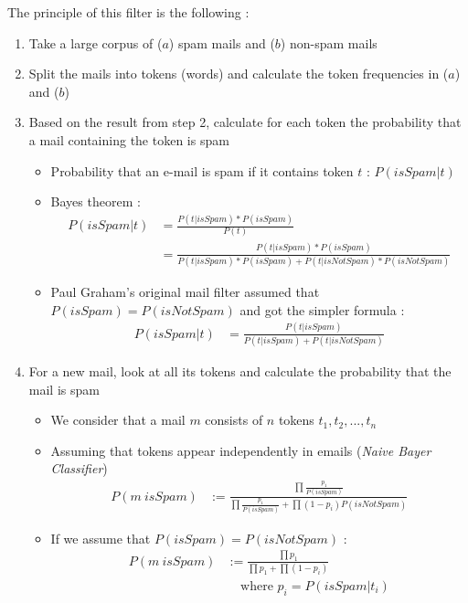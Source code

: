 The principle of this filter is the following :
\begin{enumerate}
    \item Take a large corpus of ($a$) spam mails and ($b$) non-spam mails
    \item Split the mails into tokens (words) and calculate the token frequencies in ($a$) and ($b$)
    \item Based on the result from step 2, calculate for each token the probability that a mail containing the token is spam
    \begin{itemize}
        \item Probability that an e-mail is spam if it contains token $t$ : $P(isSpam | t)$
        \item Bayes theorem :
        \begin{align*}
        P(isSpam | t) &= \frac{P(t | isSpam) * P(isSpam)}{P(t)}\\
                      &= \frac{P(t | isSpam) * P(isSpam)}{P(t | isSpam) * P(isSpam) + P(t | isNotSpam) * P(isNotSpam)}
        \end{align*}
        \item Paul Graham's original mail filter assumed that $P(isSpam) = P(isNotSpam)$ and got the simpler formula :
        \begin{align*}
        P(isSpam | t) &= \frac{P(t | isSpam)}{P(t | isSpam) + P(t | isNotSpam)}
        \end{align*}
    \end{itemize}
    \item For a new mail, look at all its tokens and calculate the probability that the mail is spam
    \begin{itemize}
        \item We consider that a mail $m$ consists of $n$ tokens $t_1, t_2, ..., t_n$
        \item Assuming that tokens appear independently in emails (\textit{Naive Bayer Classifier})
        \begin{align*}
        P(m\ isSpam) &:= \frac{\prod \frac{p_1}{P(isSpam)}}{\prod \frac{p_1}{P(isSpam)} + \prod(1-p_i)P(isNotSpam)}
        \end{align*}
        \item If we assume that $P(isSpam) = P(isNotSpam)$ :
        \begin{align*}
        P(m\ isSpam) &:= \frac{\prod p_1}{\prod p_1 + \prod(1-p_i)}\\
                     &\ \ \ \ \ \text{where }p_i = P(isSpam | t_i)
        \end{align*}
    \end{itemize}
\end{enumerate}

